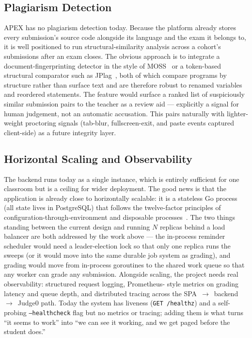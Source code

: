 \subsection{Plagiarism Detection}

APEX has no plagiarism detection today. Because the platform already stores every
submission's source code alongside its language and the exam it belongs to, it
is well positioned to run structural-similarity analysis across a cohort's
submissions after an exam closes. The obvious approach is to integrate a
document-fingerprinting detector in the style of MOSS~\cite{moss} or a
token-based structural comparator such as JPlag~\cite{prechelt2002jplag}, both of
which compare programs by structure rather than surface text and are therefore
robust to renamed variables and reordered statements. The feature would surface a
ranked list of suspiciously similar submission pairs to the teacher as a review
aid --- explicitly a signal for human judgement, not an automatic accusation.
This pairs naturally with lighter-weight proctoring signals (tab-blur,
fullscreen-exit, and paste events captured client-side) as a future integrity
layer.

\subsection{Horizontal Scaling and Observability}

The backend runs today as a single instance, which is entirely sufficient for
one classroom but is a ceiling for wider deployment. The good news is that the
application is already close to horizontally scalable: it is a stateless Go
process (all state lives in PostgreSQL) that follows the twelve-factor
principles of configuration-through-environment and disposable
processes~\cite{twelvefactor}. The two things standing between the current design
and running \(N\) replicas behind a load balancer are both addressed by the work
above --- the in-process reminder scheduler would need a leader-election lock so
that only one replica runs the sweeps (or it would move into the same durable
job system as grading), and grading would move from in-process goroutines to the
shared work queue so that any worker can grade any submission. Alongside scaling,
the project needs real observability: structured request logging, Prometheus-
style metrics on grading latency and queue depth, and distributed tracing across
the SPA~\(\rightarrow\)~backend~\(\rightarrow\)~Judge0 path. Today the system has
liveness (\texttt{GET /healthz}) and a self-probing \texttt{--healthcheck} flag
but no metrics or tracing; adding them is what turns ``it seems to work'' into
``we can see it working, and we get paged before the student does.''

